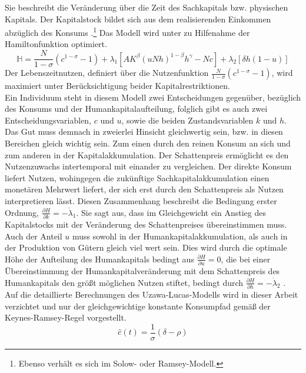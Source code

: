 %
Sie beschreibt die Veränderung über die Zeit des Sachkapitals bzw. physischen Kapitals. Der Kapitalstock bildet sich aus dem realisierenden Einkommen abzüglich des Konsums \cite{Aghion.2015}.\footnote{Ebenso verhält es sich im Solow- oder Ramsey-Modell.}
Das Modell wird unter zu Hilfenahme der Hamiltonfunktion optimiert. 
%
\begin{equation}
	\mathbb{H}=\frac{N}{1-\sigma}(c^{1-\sigma}-1)+\lambda_1[AK^\beta(uNh)^{1-\beta}h^\gamma-Nc]+\lambda_2[\delta h(1-u)]
\end{equation}
%
Der Lebenszeitnutzen, definiert über die Nutzenfunktion $\frac{N}{1-\sigma}(c^{1-\sigma}-1)$, wird maximiert unter Berücksichtigung beider Kapitalrestriktionen. \\
%
 Ein Individuum steht in diesem Modell zwei Entscheidungen gegenüber, bezüglich des Konsums und der Humankapitalaufteilung, folglich gibt es auch zwei Entscheidungsvariablen, $c$ und $u$, sowie die beiden Zustandsvariablen $k$ und $h$. \\
%
 Das Gut muss demnach in zweierlei Hinsicht gleichwertig sein, bzw. in diesen Bereichen gleich wichtig sein. Zum einen durch den reinen Konsum an sich und zum anderen in der Kapitalakkumulation. Der Schattenpreis ermöglicht es den Nutzenzuwachs intertemporal mit einander zu vergleichen. Der direkte Konsum liefert Nutzen, wohingegen die zukünftige Sachkapitalakkumulation einen monetären Mehrwert liefert, der sich erst durch den Schattenpreis als Nutzen interpretieren lässt.  Diesen Zusammenhang beschreibt die Bedingung erster Ordnung, $\frac{\partial H}{\partial k}=-\dot{\lambda}_1$. Sie sagt aus, dass im Gleichgewicht ein Anstieg des Kapitalstocks mit der Veränderung des Schattenpreises übereinstimmen muss. \\
%
Auch der Anteil $u$ muss sowohl in der Humankapitalakkumulation, als auch in der Produktion von Gütern gleich viel wert sein. Dies wird durch die optimale Höhe der Aufteilung des Humankapitals bedingt aus $\frac{\partial H}{\partial u}=0$, die bei einer Übereinstimmung der Humankapitalveränderung mit dem Schattenpreis des Humankapitals den größt möglichen Nutzen stiftet, bedingt durch $\frac{\partial H}{\partial h}=-\dot{\lambda}_2$ \cite[S.~20--21]{Lucas.1988}.\\
%
Auf die detaillierte  Berechnungen des Uzawa-Lucas-Modells wird in dieser Arbeit verzichtet und nur der gleichgewichtige konstante Konsumpfad gemäß der Keynes-Ramsey-Regel vorgestellt.
%
\begin{equation}
	\hat{c}(t)=\frac{1}{\sigma}(\delta-\rho)
\end{equation}
